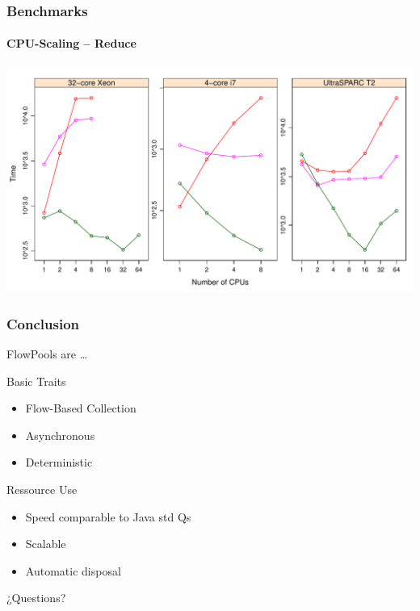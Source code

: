 \documentclass{beamer}
\begin{document}
\begin{frame}
  \frametitle{Benchmarks}
  \framesubtitle{CPU-Scaling -- Reduce}
  \includegraphics[width=\textwidth]{../../benchmarks/pres_graphs/cpu-scaling-reduce}

\end{frame}


\begin{frame}
  \frametitle{Conclusion}

  {\Large FlowPools are \ldots}

  \pause
  \begin{block}{Basic Traits}
    \begin{itemize}
    \item Flow-Based Collection
    \item Asynchronous
    \item Deterministic
    \end{itemize}
  \end{block}
      
  \pause
  \begin{block}{Ressource Use}
    \begin{itemize}
    \item Speed comparable to Java std Qs
    \item Scalable
    \item Automatic disposal
    \end{itemize}
  \end{block}

  \pause
  \begin{block}{¿Questions?}
  \end{block}

\end{frame}
\end{document}

